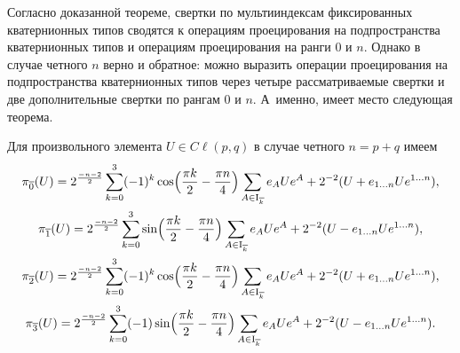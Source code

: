 \smallskip

Согласно доказанной теореме, свертки по мультииндексам фиксированных кватернионных типов сводятся к операциям проецирования на подпространства кватернионных типов и операциям проецирования на ранги $0$ и $n$. Однако в случае четного $n$ верно и обратное: можно выразить операции проецирования на подпространства кватернионных типов через четыре рассматриваемые свертки и две дополнительные свертки по рангам $0$ и $n$. А~именно, имеет место следующая теорема.

\smallskip

\begin{theorem}[9]Для произвольного элемента $U\in{{C}\!\ell}(p,q)$ в случае четного $n=p+q$ имеем
\begin{gather}
\pi_{\overline 0}(U)=2^{\frac{-n-2}{2}}\sum_{k=0}^3(-1)^k \cos\Bigl(\frac{\pi k}{2}-\frac{\pi n}{4}\Bigr)\sum_{A\in{\rm I}_ {\overline k}} e_A U e^A+2^{-2}(U+e_{1\ldots n}Ue^{1\ldots n}),
\\
\pi_{\overline 1}(U)=2^{\frac{-n-2}{2}}\sum_{k=0}^3\sin\Bigl(\frac{\pi k}{2}-\frac{\pi n}{4}\Bigr)\sum_{A\in{\rm I}_ {\overline k}} e_A U e^A+2^{-2}(U-e_{1\ldots n}Ue^{1\ldots n}),
\\
\pi_{\overline 2}(U)= 2^{\frac{-n-2}{2}}\sum_{k=0}^3(-1)^k \cos\Bigl(\frac{\pi k}{2}-\frac{\pi n}{4}\Bigr)\sum_{A\in{\rm I}_ {\overline k}} e_A U e^A+2^{-2}(U+e_{1\ldots n}Ue^{1\ldots n}),
\\
\pi_{\overline 3}(U)=2^{\frac{-n-2}{2}}\sum_{k=0}^3(-1)\sin\Bigl(\frac{\pi k}{2}-\frac{\pi n}{4}\Bigr)\sum_{A\in{\rm I}_ {\overline k}} e_A U e^A+2^{-2}(U-e_{1\ldots n}Ue^{1\ldots n}).
\end{gather}
\end{theorem}

\smallskip

